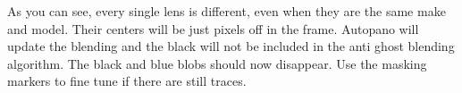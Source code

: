 \begin{fullwidth}

As you can see, every single lens is different, even when they are the same make and model. Their centers will be just pixels off in the frame. Autopano will update the blending and the black will not be included in the anti ghost blending algorithm. The black and blue blobs should now disappear. Use the masking markers to fine tune if there are still traces.

\clearpage
\end{fullwidth}